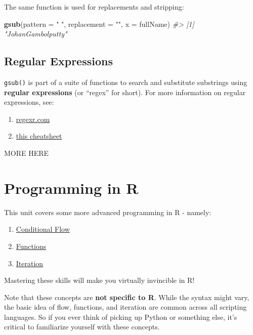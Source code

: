 \documentclass[]{book}
\newenvironment{Shaded}{\begin{snugshade}}{\end{snugshade}}
\newcommand{\KeywordTok}[1]{\textcolor[rgb]{0.13,0.29,0.53}{\textbf{#1}}}
\newcommand{\DataTypeTok}[1]{\textcolor[rgb]{0.13,0.29,0.53}{#1}}
\newcommand{\StringTok}[1]{\textcolor[rgb]{0.31,0.60,0.02}{#1}}
\newcommand{\CommentTok}[1]{\textcolor[rgb]{0.56,0.35,0.01}{\textit{#1}}}
\newcommand{\NormalTok}[1]{#1}
\providecommand{\tightlist}{%
  \setlength{\itemsep}{0pt}\setlength{\parskip}{0pt}}
\begin{document}
The same function is used for replacements and stripping:

\begin{Shaded}
\begin{Highlighting}[]
\KeywordTok{gsub}\NormalTok{(}\DataTypeTok{pattern =} \StringTok{" "}\NormalTok{, }\DataTypeTok{replacement =} \StringTok{""}\NormalTok{, }\DataTypeTok{x =}\NormalTok{ fullName) }
\CommentTok{#> [1] "JohanGambolputty"}
\end{Highlighting}
\end{Shaded}

\hypertarget{regular-expressions}{\section{Regular
Expressions}\label{regular-expressions}}

\texttt{gsub()} is part of a suite of functions to search and substitute
substrings using \textbf{regular expressions} (or ``regex'' for short).
For more information on regular expressions, see:

\begin{enumerate}
\def\labelenumi{\arabic{enumi}.}
\tightlist
\item
  \href{https://regexr.com/}{regexr.com}
\item
  \href{https://medium.com/factory-mind/regex-tutorial-a-simple-cheatsheet-by-examples-649dc1c3f285}{this
  cheatsheet}
\end{enumerate}

MORE HERE

\chapter{Programming in R}\label{programming-in-r}

This unit covers some more advanced programming in R - namely:

\begin{enumerate}
\def\labelenumi{\arabic{enumi}.}
\tightlist
\item
  \protect\hyperlink{conditional-flow}{Conditional Flow}
\item
  \protect\hyperlink{functions-1}{Functions}
\item
  \protect\hyperlink{iteration}{Iteration}
\end{enumerate}

Mastering these skills will make you virtually invincible in R!

Note that these concepts are \textbf{not specific to R}. While the
syntax might vary, the basic idea of flow, functions, and iteration are
common across all scripting languages. So if you ever think of picking
up Python or something else, it's critical to familiarize yourself with
these concepts.
\end{document}
